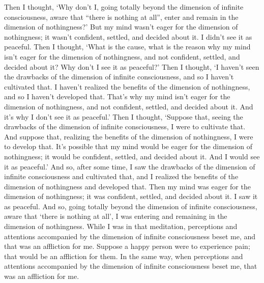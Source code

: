 \documentclass[12pt,openany]{book}%
\begin{document}
Then I thought, ‘Why don’t I, going totally beyond the dimension of infinite consciousness, aware that “there is nothing at all”, enter and remain in the dimension of nothingness?’ But my mind wasn’t eager for the dimension of nothingness; it wasn’t confident, settled, and decided about it. I didn’t see it as peaceful. Then I thought, ‘What is the cause, what is the reason why my mind isn’t eager for the dimension of nothingness, and not confident, settled, and decided about it? Why don’t I see it as peaceful?’ Then I thought, ‘I haven’t seen the drawbacks of the dimension of infinite consciousness, and so I haven’t cultivated that. I haven’t realized the benefits of the dimension of nothingness, and so I haven’t developed that. That’s why my mind isn’t eager for the dimension of nothingness, and not confident, settled, and decided about it. And it’s why I don’t see it as peaceful.’ Then I thought, ‘Suppose that, seeing the drawbacks of the dimension of infinite consciousness, I were to cultivate that. And suppose that, realizing the benefits of the dimension of nothingness, I were to develop that. It’s possible that my mind would be eager for the dimension of nothingness; it would be confident, settled, and decided about it. And I would see it as peaceful.’ And so, after some time, I saw the drawbacks of the dimension of infinite consciousness and cultivated that, and I realized the benefits of the dimension of nothingness and developed that. Then my mind was eager for the dimension of nothingness; it was confident, settled, and decided about it. I saw it as peaceful. And so, going totally beyond the dimension of infinite consciousness, aware that ‘there is nothing at all’, I was entering and remaining in the dimension of nothingness. While I was in that meditation, perceptions and attentions accompanied by the dimension of infinite consciousness beset me, and that was an affliction for me. Suppose a happy person were to experience pain; that would be an affliction for them. In the same way, when perceptions and attentions accompanied by the dimension of infinite consciousness beset me, that was an affliction for me. 
\end{document}
